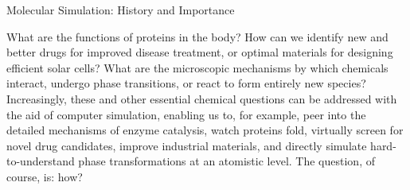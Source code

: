 \begin{section}{Molecular Simulation: History and Importance}

What are the functions of proteins in the body? How can we identify new and better drugs for improved
disease treatment, or optimal materials for designing efficient solar cells?
What are the microscopic mechanisms by which chemicals interact, undergo phase
transitions, or react to form entirely new species? Increasingly, these and other 
essential chemical questions can be addressed with the aid of computer
simulation, 
\cite{VanGunsteren1990,Hospital2015,Chen2015,Karplus2002,Ciccotti2014}
enabling us to, for example, peer into the detailed mechanisms of enzyme catalysis,
\cite{Warshel2003}
watch proteins fold,
\cite{Levitt1975,Lane2013,Piana2014,Perez2016}
virtually screen for novel drug candidates, 
\cite{DeVivo2016}
improve industrial materials,
\cite{Jiang2011,Maurin2016,Bereau2016}
and directly simulate hard-to-understand phase transformations at an atomistic level.
\cite{Kalikmanov2013,Wilding2001}
The question, of course, is: how?



\end{section}
